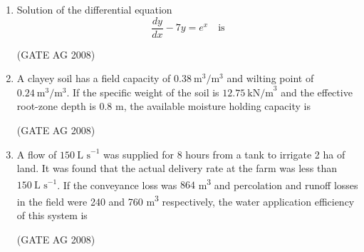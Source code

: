 \documentclass[journal]{IEEEtran}
\begin{document}
\begin{enumerate}
\medskip

\item 
 Solution of the differential equation 
\[\frac{dy}{dx} - 7y = e^x \quad \text{is}\]
\begin{enumerate}
\end{enumerate}
\hfill(GATE AG 2008)\\

\medskip

\item 
 A clayey soil has a field capacity of $0.38\ \text{m}^3/\text{m}^3$ and wilting point of $0.24\ \text{m}^3/\text{m}^3$. If the specific weight of the soil is $12.75\ \text{kN/m}^3$ and the effective root-zone depth is $0.8$ m, the available moisture holding capacity is
\begin{enumerate}
\end{enumerate}
\hfill(GATE AG 2008)\\

\medskip

\item 
 A flow of $150\ \text{L s}^{-1}$ was supplied for 8 hours from a tank to irrigate 2 ha of land. It was found that the actual delivery rate at the farm was less than $150\ \text{L s}^{-1}$. If the conveyance loss was $864$ m\textsuperscript{3} and percolation and runoff losses in the field were 240 and 760 m\textsuperscript{3} respectively, the water application efficiency of this system is
\begin{enumerate}
\end{enumerate}
\hfill(GATE AG 2008)\\


\end{enumerate}
\end{document}
